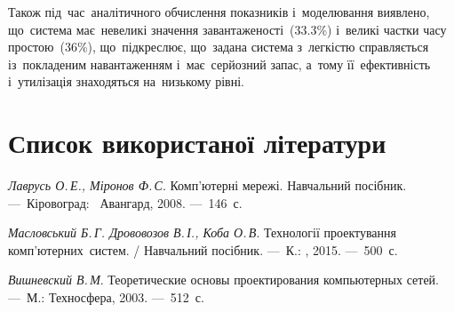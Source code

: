 \documentclass[
  ukrainian,
  simple,
  floatsection,
]{eskdnaukvd}
\begin{document}
    Також під~час~аналітичного обчислення показників і~моделювання виявлено, що~система має~невеликі значення завантаженості~(\num{33.3}\%) і~великі частки часу простою~(\num{36}\%), що~підкреслює, що~задана система з~легкістю справляється із~покладеним навантаженням і~має~серйозний запас, а~тому її~ефективність і~утилізація знаходяться на~низькому рівні.

  \section*{Список використаної літератури}

    \begin{litlist}
    \item \textit{Лаврусь О.\,Е., Міронов Ф.\,С}. Комп'ютерні мережі. Навчальний посібник. —~Кіровоград: ~Авангард, 2008. —~146~с.
    \item \textit{Масловський Б.\,Г. Дрововозов В.\,І., Коба О.\,В}. Технології проектування ком\-п’\-ю\-тер\-них~систем. / Навчальний посібник. —~К.: , 2015. —~500~с.
    \item \textit{Вишневский В.\,М}. Теоретические основы проектирования компьютерных сетей. —~М.: Техносфера, 2003. —~512~с.
    \end{litlist}
\end{document}
